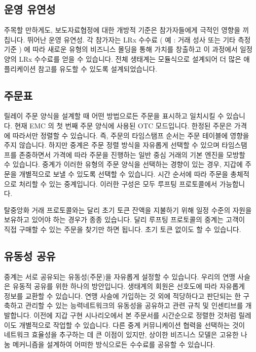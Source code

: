 \documentclass{article}
\begin{document}
\begin{multicols}{2}
\section{운영 유연성\label{sec:business_model}}
\indent 주목할 만하게도, 보도자료협정에 대한 개방적 기준은 참가자들에게 극적인 영향을 끼칩니다. 뛰어난 운영 유연성. 각 참가자는 LRx 수수료 ( 예 : 거래 성사 또는 기타 측정 기준 ) 에 따라 새로운 유형의 비즈니스 몰딩을 통해 가치를 창출하고 이 과정에서 일정 양의 LRx 수수료를 얻을 수 있습니다. 전체 생태계는 모듈식으로 설계되어 더 많은 애플리케이션 참고를 유도할 수 있도록 설계되었습니다.

\subsection{주문표\label{sec:order_book}}
\indent 릴레이 주문 양식을 설계할 때 어떤 방법으로든 주문을 표시하고 일치시킬 수 있습니다. 현재 EMC 의 첫 번째 주문 양식에 사용된 OTC 모드입니다. 한정된 주문은 가격에 따라서만 정렬할 수 있습니다. 즉, 주문의 타임스탬프 순서는 주문 테이블에 영향을 주지 않습니다. 하지만 중계은 주문 정렬 방식을 자유롭게 선택할 수 있으며 타임스탬프를 존중하면서 가격에 따라 주문을 진행하는 일반 중심 거래의 기본 엔진을 모방할 수 있습니다. 중계가 이러한 유형의 주문 양식을 선택하는 경향이 있는 경우, 지갑에 주문을 개별적으로 보낼 수 있도록 선택할 수 있습니다. 시간 순서에 따라 주문을 총체적으로 처리할 수 있는 중계입니다. 이러한 구성은 모두 루프팅 프로토콜에서 가능합니다.

\indent 탈중앙화 거래 프로토콜와는 달리 초기 토큰 잔액을 지불하기 위해 일정 수준의 자원을 보유하고 있어야 하는 경우가 종종 있습니다. 달리 루프팅 프로토콜의 중계는 고객이 직접 구매할 수 있는 주문을 찾기만 하면 됩니다. 초기 토큰 없이도 할 수 있습니다.

\subsection{유동성 공유\label{sec:liquidity_sharing}}
\indent 중계는 서로 공유되는 유동성(주문)을 자유롭게 설정할 수 있습니다. 우리의 연맹 사슬은 유동적 공유를 위한 하나의 방안입니다. 생태계의 회원은 선호도에 따라 자유롭게 정보를 교환할 수 있습니다. 연맹 사슬에 가입하는 것 외에 적당하다고 판단되는 한 구축하고 관리할 수 있는 능력네트워크의 유동성을 공유하고 관련 규칙 및 인센티브를 개발합니다. 이전에 지갑 구현 시나리오에서 본 주문서를 시간순으로 정렬한 것처럼 릴레이도 개별적으로 작업할 수 있습니다. 다른 중계 커뮤니케이션 협력을 선택하는 것이 네트워크 효율성을 추구하는 데 큰 이점이 있지만, 상이한 비즈니스 모델은 고유한 나눔 메커니즘을 설계하여 어떠한 방식으로든 수수료를 공유할 수 있습니다.



\end{multicols}
\end{document}
